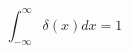 \documentclass[a4j]{jarticle}
\begin{document}
    \begin{equation}
        \int_{-\infty}^{\infty} \delta(x) dx = 1
    \end{equation}
\end{document}
